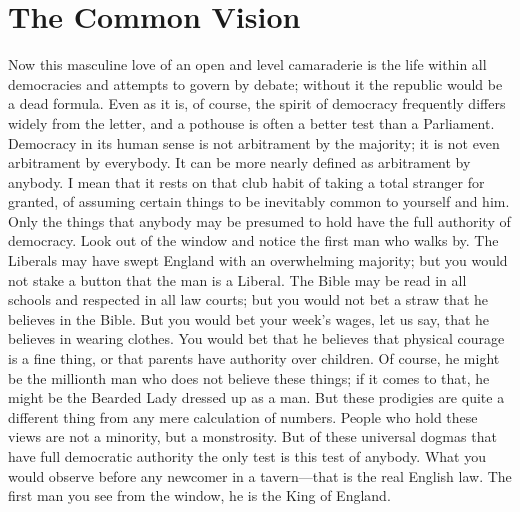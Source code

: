 \documentclass{book}
\begin{document}
\chapter{The Common Vision}
\label{chapter-16}
Now this masculine love of an open and level camaraderie is the life within all democracies and attempts to govern by debate; without it the republic would be a dead formula. Even as it is, of course, the spirit of democracy frequently differs widely from the letter, and a pothouse is often a better test than a Parliament. Democracy in its human sense is not arbitrament by the majority; it is not even arbitrament by everybody. It can be more nearly defined as arbitrament by anybody. I mean that it rests on that club habit of taking a total stranger for granted, of assuming certain things to be inevitably common to yourself and him. Only the things that anybody may be presumed to hold have the full authority of democracy. Look out of the window and notice the first man who walks by. The Liberals may have swept England with an overwhelming majority; but you would not stake a button that the man is a Liberal. The Bible may be read in all schools and respected in all law courts; but you would not bet a straw that he believes in the Bible. But you would bet your week’s wages, let us say, that he believes in wearing clothes. You would bet that he believes that physical courage is a fine thing, or that parents have authority over children. Of course, he might be the millionth man who does not believe these things; if it comes to that, he might be the Bearded Lady dressed up as a man. But these prodigies are quite a different thing from any mere calculation of numbers. People who hold these views are not a minority, but a monstrosity. But of these universal dogmas that have full democratic authority the only test is this test of anybody. What you would observe before any newcomer in a tavern—that is the real English law. The first man you see from the window, he is the King of England.
\end{document}
